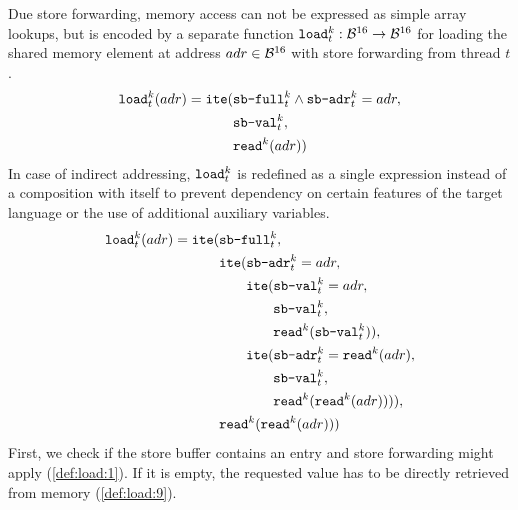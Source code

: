 Due store forwarding, memory access can not be expressed as simple array lookups, but is encoded by a separate function $\texttt{load}^k_t: \mathcal{B}^{16} \to \mathcal{B}^{16}$ for loading the shared memory element at address $adr \in \mathcal{B}^{16}$ with store forwarding from thread $t$. %
\begin{align*}
  \texttt{load}^k_t(adr) = \texttt{ite}(& \texttt{sb-full}^k_t \land \texttt{sb-adr}^k_t = adr, \\
  & \texttt{sb-val}^k_t, \\
  & \texttt{read}^k(adr))
\end{align*}
In case of indirect addressing, $\texttt{load}^k_t$ is redefined as a single expression instead of a composition with itself to prevent dependency on certain features of the target language or the use of additional auxiliary variables.
\begin{align}
  \texttt{load}^k_t(adr) = \texttt{ite}(& \texttt{sb-full}^k_t, \label{def:load:1} \\
  & \texttt{ite}(\texttt{sb-adr}^k_t = adr, \label{def:load:2} \\
  & \;\;\;\;\;\;\; \texttt{ite}(\texttt{sb-val}^k_t = adr, \label{def:load:3} \\
  & \;\;\;\;\;\;\; \;\;\;\;\;\;\; \texttt{sb-val}^k_t, \label{def:load:4} \\
  & \;\;\;\;\;\;\; \;\;\;\;\;\;\; \texttt{read}^k(\texttt{sb-val}^k_t)), \label{def:load:5} \\
  & \;\;\;\;\;\;\; \texttt{ite}(\texttt{sb-adr}^k_t = \texttt{read}^k(adr), \label{def:load:6} \\
  & \;\;\;\;\;\;\; \;\;\;\;\;\;\; \texttt{sb-val}^k_t, \label{def:load:7}\\
  & \;\;\;\;\;\;\; \;\;\;\;\;\;\; \texttt{read}^k(\texttt{read}^k(adr)))), \label{def:load:8} \\
  & \texttt{read}^k(\texttt{read}^k(adr))) \label{def:load:9}
\end{align}
First, we check if the store buffer contains an entry and store forwarding might apply (\ref{def:load:1}).
If it is empty, the requested value has to be directly retrieved from memory (\ref{def:load:9}).
